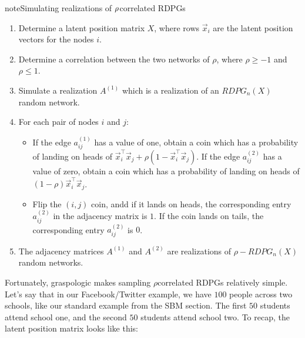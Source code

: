 \documentclass[letterpaper,10pt,english]{jupyterBook}
\begin{document}
\begin{sphinxadmonition}{note}{Simulating realizations of \protect\(\rho\protect\)\sphinxhyphen{}correlated RDPGs}
\begin{enumerate}
%
\item {} 
\sphinxAtStartPar
Determine a latent position matrix \(X\), where rows \(\vec x_i\) are the latent position vectors for the nodes \(i\).

\item {} 
\sphinxAtStartPar
Determine a correlation between the two networks of \(\rho\), where \(\rho \geq -1\) and \(\rho \leq 1\).

\item {} 
\sphinxAtStartPar
Simulate a realization \(A^{(1)}\) which is a realization  of an \(RDPG_n(X)\) random network.

\item {} 
\sphinxAtStartPar
For each pair of nodes \(i\) and \(j\):
\begin{itemize}
\item {} 
\sphinxAtStartPar
If the edge \(a_{ij}^{(1)}\) has a value of one, obtain a coin which has a probability of landing on heads of \(\vec x_i^\top \vec x_j + \rho(1 - \vec x_i^\top \vec x_j)\). If the edge \(a_{ij}^{(2)}\) has a value of zero, obtain a coin which has a probability of landing on heads of \((1 - \rho)\vec x_i^\top \vec x_j\).

\item {} 
\sphinxAtStartPar
Flip the \((i,j)\) coin, andd if it lands on heads, the corresponding entry \(a_{ij}^{(2)}\) in the adjacency matrix is \(1\). If the coin lands on tails, the corresponding entry \(a_{ij}^{(2)}\) is \(0\).

\end{itemize}

\item {} 
\sphinxAtStartPar
The adjacency matrices \(A^{(1)}\) and \(A^{(2)}\) are realizations of \(\rho-RDPG_n(X)\) random networks.

\end{enumerate}
\end{sphinxadmonition}

\sphinxAtStartPar
Fortunately, graspologic makes sampling \(\rho\)\sphinxhyphen{}correlated RDPGs relatively simple. Let’s say that in our Facebook/Twitter example, we have \(100\) people across two schools, like our standard example from the SBM section. The first \(50\) students attend school one, and the second \(50\) students attend school two. To recap, the latent position matrix looks like this:
\end{document}
